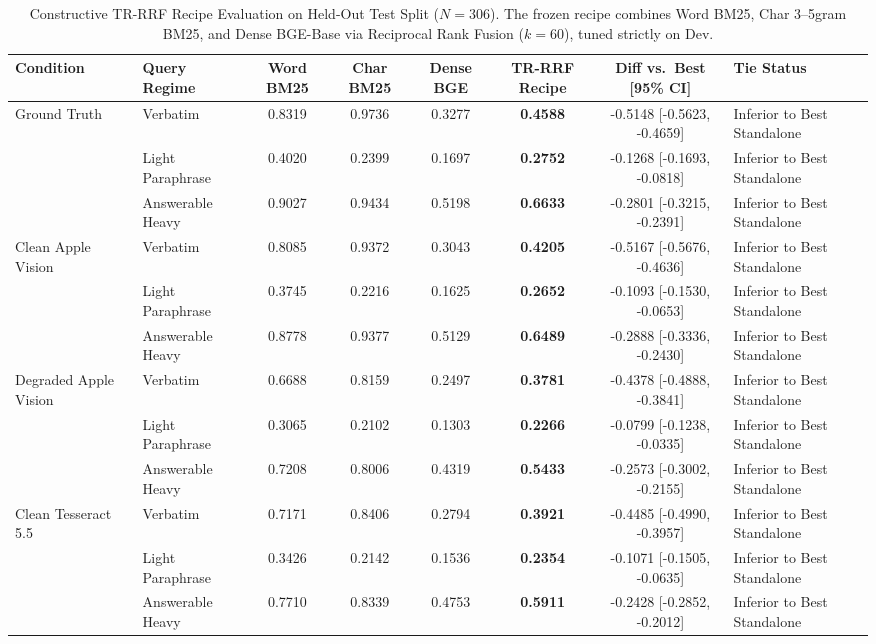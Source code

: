 \begin{table}[t]
\centering\small
\caption{Constructive TR-RRF Recipe Evaluation on Held-Out Test Split ($N=306$). The frozen recipe combines Word BM25, Char 3--5gram BM25, and Dense BGE-Base via Reciprocal Rank Fusion ($k=60$), tuned strictly on Dev.}\label{tab:recipe_summary_v6}
\begin{tabular}{llcccccl}
\toprule
Condition & Query Regime & Word BM25 & Char BM25 & Dense BGE & TR-RRF Recipe & Diff vs.\ Best [95\% CI] & Tie Status \\
\midrule
Ground Truth & Verbatim & 0.8319 & 0.9736 & 0.3277 & \textbf{0.4588} & -0.5148 [-0.5623, -0.4659] & Inferior to Best Standalone \\
 & Light Paraphrase & 0.4020 & 0.2399 & 0.1697 & \textbf{0.2752} & -0.1268 [-0.1693, -0.0818] & Inferior to Best Standalone \\
 & Answerable Heavy & 0.9027 & 0.9434 & 0.5198 & \textbf{0.6633} & -0.2801 [-0.3215, -0.2391] & Inferior to Best Standalone \\
Clean Apple Vision & Verbatim & 0.8085 & 0.9372 & 0.3043 & \textbf{0.4205} & -0.5167 [-0.5676, -0.4636] & Inferior to Best Standalone \\
 & Light Paraphrase & 0.3745 & 0.2216 & 0.1625 & \textbf{0.2652} & -0.1093 [-0.1530, -0.0653] & Inferior to Best Standalone \\
 & Answerable Heavy & 0.8778 & 0.9377 & 0.5129 & \textbf{0.6489} & -0.2888 [-0.3336, -0.2430] & Inferior to Best Standalone \\
Degraded Apple Vision & Verbatim & 0.6688 & 0.8159 & 0.2497 & \textbf{0.3781} & -0.4378 [-0.4888, -0.3841] & Inferior to Best Standalone \\
 & Light Paraphrase & 0.3065 & 0.2102 & 0.1303 & \textbf{0.2266} & -0.0799 [-0.1238, -0.0335] & Inferior to Best Standalone \\
 & Answerable Heavy & 0.7208 & 0.8006 & 0.4319 & \textbf{0.5433} & -0.2573 [-0.3002, -0.2155] & Inferior to Best Standalone \\
Clean Tesseract 5.5 & Verbatim & 0.7171 & 0.8406 & 0.2794 & \textbf{0.3921} & -0.4485 [-0.4990, -0.3957] & Inferior to Best Standalone \\
 & Light Paraphrase & 0.3426 & 0.2142 & 0.1536 & \textbf{0.2354} & -0.1071 [-0.1505, -0.0635] & Inferior to Best Standalone \\
 & Answerable Heavy & 0.7710 & 0.8339 & 0.4753 & \textbf{0.5911} & -0.2428 [-0.2852, -0.2012] & Inferior to Best Standalone \\

\end{tabular}
\end{table}
